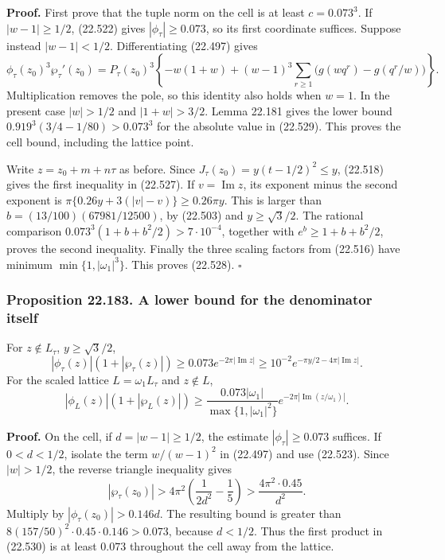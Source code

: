 \documentclass[
  11pt,
  a4paper,
]{article}
\begin{document}
\textbf{Proof.} First prove that the tuple norm on the cell is at least
\(c=0.073^3\). If \(|w-1|\ge1/2\), (22.522) gives
\(|\phi_\tau|\ge0.073\), so its first coordinate suffices. Suppose
instead \(|w-1|<1/2\). Differentiating (22.497) gives \[
 \phi_\tau(z_0)^3\wp_\tau'(z_0)
 =P_\tau(z_0)^3\left\{
 -w(1+w)+(w-1)^3
 \sum_{r\ge1}\bigl(g(wq^r)-g(q^r/w)\bigr)\right\}.
 \tag{22.529}
\] Multiplication removes the pole, so this identity also holds when
\(w=1\). In the present case \(|w|>1/2\) and \(|1+w|>3/2\). Lemma 22.181
gives the lower bound \(0.919^3(3/4-1/80)>0.073^3\) for the absolute
value in (22.529). This proves the cell bound, including the lattice
point.

Write \(z=z_0+m+n\tau\) as before. Since
\(J_\tau(z_0)=y(t-1/2)^2\le y\), (22.518) gives the first inequality in
(22.527). If \(v=\operatorname{Im}z\), its exponent minus the second
exponent is \(\pi\{0.26y+3(|v|-v)\}\ge0.26\pi y\). This is larger than
\(b=(13/100)(67981/12500)\), by (22.503) and \(y\ge\sqrt3/2\). The
rational comparison \(0.073^3(1+b+b^2/2)>7\cdot10^{-4}\), together with
\(e^b\ge1+b+b^2/2\), proves the second inequality. Finally the three
scaling factors from (22.516) have minimum \(\min\{1,|\omega_1|^3\}\).
This proves (22.528). \(\square\)

\subsubsection{Proposition 22.183. A lower bound for the denominator
itself}\label{proposition-22.183.-a-lower-bound-for-the-denominator-itself}

For \(z\notin L_\tau\), \(y\ge\sqrt3/2\), \[
 |\phi_\tau(z)|(1+|\wp_\tau(z)|)
 \ge0.073e^{-2\pi|\operatorname{Im}z|}
 \ge10^{-2}e^{-\pi y/2-4\pi|\operatorname{Im}z|}.
 \tag{22.530}
\] For the scaled lattice \(L=\omega_1L_\tau\) and \(z\notin L\), \[
 |\phi_L(z)|(1+|\wp_L(z)|)
 \ge\frac{0.073|\omega_1|}{\max\{1,|\omega_1|^2\}}
       e^{-2\pi|\operatorname{Im}(z/\omega_1)|}.
 \tag{22.531}
\]

\textbf{Proof.} On the cell, if \(d=|w-1|\ge1/2\), the estimate
\(|\phi_\tau|\ge0.073\) suffices. If \(0<d<1/2\), isolate the term
\(w/(w-1)^2\) in (22.497) and use (22.523). Since \(|w|>1/2\), the
reverse triangle inequality gives \[
 |\wp_\tau(z_0)|
 >4\pi^2\left(\frac1{2d^2}-\frac15\right)
 >\frac{4\pi^2\cdot0.45}{d^2}.
 \tag{22.532}
\] Multiply by \(|\phi_\tau(z_0)|>0.146d\). The resulting bound is
greater than \(8(157/50)^2\cdot0.45\cdot0.146>0.073\), because
\(d<1/2\). Thus the first product in (22.530) is at least \(0.073\)
throughout the cell away from the lattice.
\end{document}
